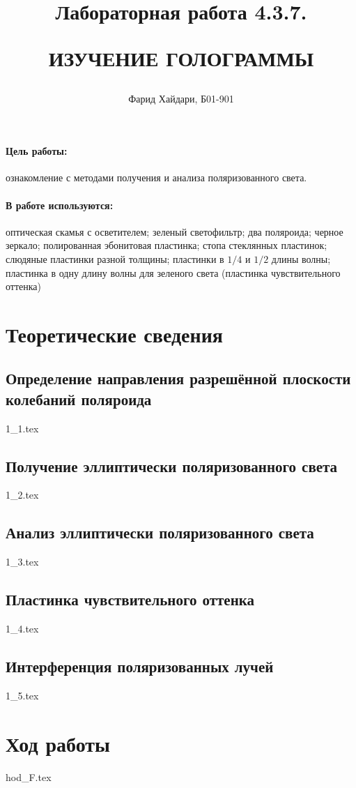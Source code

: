 \documentclass[a5paper,10pt, twoside]{article} %
\title
{
\hfill \break	\hfill \break
\hfill \break	\hfill \break
Лабораторная работа 4.3.7.

ИЗУЧЕНИЕ ГОЛОГРАММЫ
}
\author{Фарид Хайдари, Б01-901}
\begin{document}
\maketitle


\thispagestyle{empty} %

\newpage

\tableofcontents %
\thispagestyle{plain}
\newpage


\paragraph{Цель работы:}

ознакомление с методами получения и анализа поляризованного света.

\paragraph{В работе используются:}

оптическая скамья с осветителем; зеленый светофильтр; два поляроида; черное зеркало; 
полированная эбонитовая пластинка; стопа стеклянных пластинок; слюдяные пластинки 
разной толщины; пластинки в $1/4$ и $1/2$ длины волны; пластинка в одну длину волны для 
зеленого света (пластинка чувствительного оттенка)

\section{Теоретические сведения}

  \subsection{Определение направления разрешённой плоскости колебаний поляроида}
  {1_1.tex}

  \subsection{Получение эллиптически поляризованного света}
  {1_2.tex}

  \subsection{Анализ эллиптически поляризованного света}
  {1_3.tex}

  \subsection{Пластинка чувствительного оттенка}
  {1_4.tex}

  \subsection{Интерференция поляризованных лучей}
  {1_5.tex}
\section{Ход работы}
{hod_F.tex}
\end{document}
